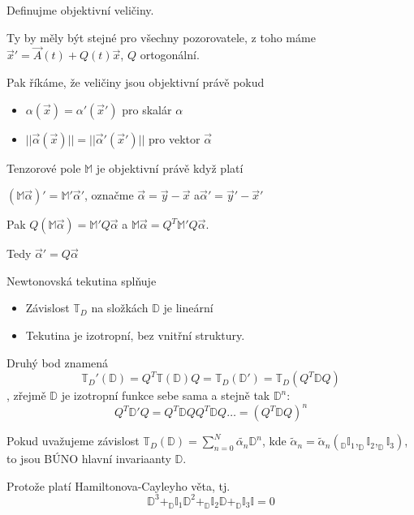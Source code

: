 \documentclass[../main.tex]{subfiles}
\begin{document}
Definujme objektivní veličiny.

Ty by měly být stejné pro všechny pozorovatele, z toho máme $\vec{x}' = \vec{A}(t) + Q(t) \vec{x}$, $Q$ ortogonální.

Pak říkáme, že veličiny jsou objektivní právě pokud 
\begin{itemize}
    \item $\alpha(\vec{x}) = \alpha' (\vec{x}')$ pro skalár $\alpha$
    \item $||\vec{\alpha} (\vec{x})|| = ||\vec{\alpha}' (\vec{x}')||$ pro vektor $\vec{\alpha}$
\end{itemize}
Tenzorové pole $\mathbb{M}$ je objektivní právě když platí 

$(\mathbb{M} \vec{\alpha})' = \mathbb{M}' \vec{\alpha}'$, označme $\vec{\alpha} = \vec{y} - \vec{x}$  a$\vec{\alpha}' = \vec{y}' - \vec{x}'$ 

Pak 
$Q(\mathbb{M} \vec{\alpha}) = \mathbb{M}' Q \vec{\alpha}$ a $\mathbb{M} \vec{\alpha} = Q^T \mathbb{M}' Q \vec{\alpha}$.

Tedy $\vec{\alpha}' = Q \vec{\alpha}$

Newtonovská tekutina splňuje

\begin{itemize}
    \item Závislost $\mathbb{T}_D$ na složkách $\mathbb{D}$ je lineární
    \item Tekutina je izotropní, bez vnitřní struktury.
\end{itemize}

Druhý bod znamená
\begin{equation}
    \mathbb{T}_D'(\mathbb{D}) =Q^T \mathbb{T} (\mathbb{D}) Q = \mathbb{T}_D (\mathbb{D}') = \mathbb{T}_D (Q^T \mathbb{D} Q) 
\end{equation}, zřejmě $\mathbb{D}$ je izotropní funkce sebe sama a stejně tak $\mathbb{D}^n$:
\begin{equation}
    Q^T \mathbb{D}' Q = Q^T \mathbb{D} Q Q^T \mathbb{D} Q \dots = (Q^T \mathbb{D} Q)^n 
\end{equation}

Pokud uvažujeme závislost 
$\mathbb{T}_D (\mathbb{D}) = \sum_{n=0}^N \tilde{\alpha_n} \mathbb{D}^n$, 
kde $\tilde{\alpha}_n = \tilde{\alpha}_n (_\mathbb{D} \mathbb{I}_1, _\mathbb{D} \mathbb{I}_2, _\mathbb{D} \mathbb{I}_3)$, to jsou BÚNO hlavní invariaanty $\mathbb{D}$.


Protože platí Hamiltonova-Cayleyho věta, tj. 
\begin{equation}
    \mathbb{D}^3 + _\mathbb{D} \mathbb{I}_1 \mathbb{D} ^2 + _\mathbb{D} \mathbb{I}_2 \mathbb{D} + _\mathbb{D} \mathbb{I}_3 \mathbb{I} = 0 
\end{equation}
\end{document}
